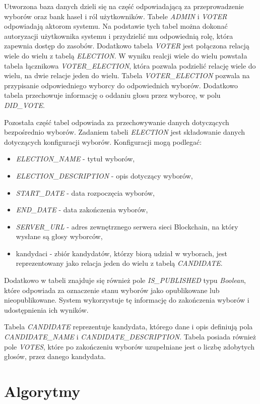\documentclass[a4paper,12pt]{book}
\begin{document}
Utworzona baza danych dzieli się na część odpowiadającą za przeprowadzenie wyborów oraz bank haseł i ról użytkowników. Tabele \textit{ADMIN} i \textit{VOTER} odpowiadają aktorom systemu. Na podstawie tych tabel można dokonać autoryzacji użytkownika systemu i przydzielić mu odpowiednią rolę, która zapewnia dostęp do zasobów. Dodatkowo tabela \textit{VOTER} jest połączona relacją wiele do wielu z tabelą \textit{ELECTION}. W wyniku realcji wiele do wielu powstała tabela łącznikowa \textit{VOTER\_ELECTION}, która pozwala podzielić relację wiele do wielu, na dwie relacje jeden do wielu. Tabela \textit{VOTER\_ELECTION} pozwala na przypisanie odpowiedniego wyborcy do odpowiednich wyborów. Dodatkowo tabela przechowuje informację o oddaniu głosu przez wyborcę, w polu \textit{DID\_VOTE}.

Pozostała część tabel odpowiada za przechowywanie danych dotyczących bezpośrednio wyborów. Zadaniem tabeli \textit{ELECTION} jest składowanie danych dotyczących konfiguracji wyborów. 
Konfiguracji mogą podlegać:
\begin{itemize}
	\item \textit{ELECTION\_NAME} - tytuł wyborów,
	\item \textit{ELECTION\_DESCRIPTION} - opis dotyczący wyborów,
	\item \textit{START\_DATE} - data rozpoczęcia wyborów,
	\item \textit{END\_DATE} - data zakończenia wyborów,
	\item \textit{SERVER\_URL} - adres zewnętrznego serwera sieci Blockchain, na który wysłane są głosy wyborców,
	\item kandydaci - zbiór kandydatów, którzy biorą udział w wyborach, jest reprezentowany jako relacja jeden do wielu z tabelą \textit{CANDIDATE}.
\end{itemize}

Dodatkowo w tabeli znajduje się również pole \textit{IS\_PUBLISHED} typu \textit{Boolean}, które odpowiada za oznaczenie stanu wyborów jako opublikowane lub nieopublikowane. System wykorzystuje tę informację do zakończenia wyborów i udostępnienia ich wyników.

Tabela \textit{CANDIDATE} reprezentuje kandydata, którego dane i opis definiują pola \textit{CANDIDATE\_NAME} i \textit{CANDIDATE\_DESCRIPTION}. Tabela posiada również pole \textit{VOTES}, które po zakończeniu wyborów uzupełniane jest o liczbę zdobytych głosów, przez danego kandydata.
\section{Algorytmy}
\end{document}
